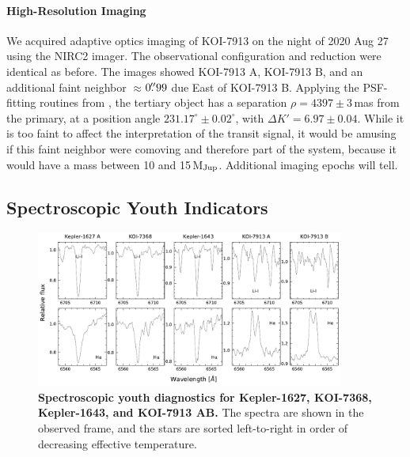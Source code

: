 \documentclass[12pt,twocolumn,tighten,linenumbers,trackchanges]{aastex63}
\begin{document}
\paragraph{High-Resolution Imaging}
We acquired adaptive optics imaging of KOI-7913 on the night of 2020
Aug 27 using the NIRC2 imager.  The observational configuration and
reduction were identical as before.  The images showed KOI-7913 A,
KOI-7913 B, and an additional faint neighbor $\approx$$0\mbox{$.\!\!^{\prime\prime}$}99$ due East
of KOI-7913 B.  Applying the PSF-fitting routines from
\citet{kraus_impact_2016}, the tertiary object has a separation $\rho =
4397 \pm 3$\,mas from the primary, at a position angle $231.17^\circ
\pm 0.02^\circ$, with $\Delta K' = 6.97 \pm 0.04$.  While it is too
faint to affect the interpretation of the transit signal, it would be
amusing if this faint neighbor were comoving and therefore part of the system, 
because it would have a mass between 10 and
15\,M$_{\rm Jup}$.  Additional imaging epochs will tell.


\subsection{Spectroscopic Youth Indicators}
\label{subsec:specyouth}

\begin{figure}[t]
	\begin{center}
		\leavevmode
			\includegraphics[width=0.9\textwidth]{f5.pdf}
	\end{center}
	\vspace{-0.6cm}
	\caption{
    {\bf Spectroscopic youth diagnostics for Kepler-1627, KOI-7368,
    Kepler-1643, and KOI-7913 AB. }
    The spectra are shown in the observed frame, and the stars are
    sorted left-to-right in order of decreasing effective temperature.
    \label{fig:koiyouthindicators}
	}
\end{figure}
\end{document}
